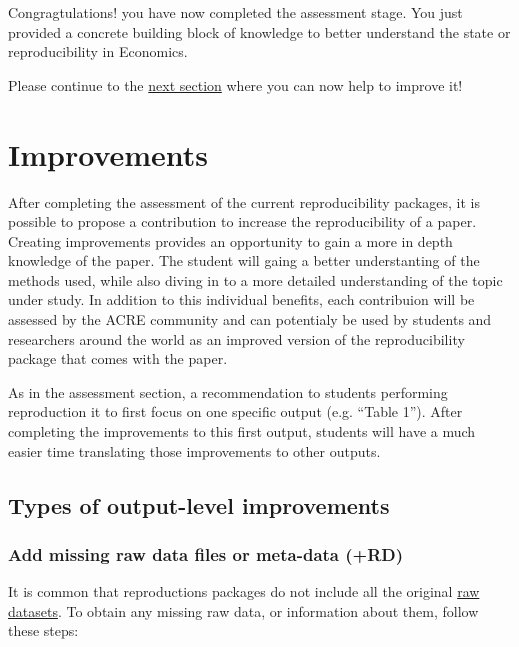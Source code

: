 \documentclass[]{book}
\begin{document}
Congragtulations! you have now completed the assessment stage. You just provided a concrete building block of knowledge to better understand the state or reproducibility in Economics.

Please continue to the \protect\hyperlink{improvements}{next section} where you can now help to improve it!

\hypertarget{improvements}{%
\chapter{Improvements}\label{improvements}}

After completing the assessment of the current reproducibility packages, it is possible to propose a contribution to increase the reproducibility of a paper. Creating improvements provides an opportunity to gain a more in depth knowledge of the paper. The student will gaing a better understanting of the methods used, while also diving in to a more detailed understanding of the topic under study. In addition to this individual benefits, each contribuion will be assessed by the ACRE community and can potentialy be used by students and researchers around the world as an improved version of the reproducibility package that comes with the paper.

As in the assessment section, a recommendation to students performing reproduction it to first focus on one specific output (e.g. ``Table 1''). After completing the improvements to this first output, students will have a much easier time translating those improvements to other outputs.

\hypertarget{types-of-output-level-improvements}{%
\section{Types of output-level improvements}\label{types-of-output-level-improvements}}

\hypertarget{add-missing-raw-data-files-or-meta-data-rd}{%
\subsection{Add missing raw data files or meta-data (+RD)}\label{add-missing-raw-data-files-or-meta-data-rd}}

It is common that reproductions packages do not include all the original \protect\hyperlink{describe-inputs}{raw datasets}. To obtain any missing raw data, or information about them, follow these steps:
\end{document}
